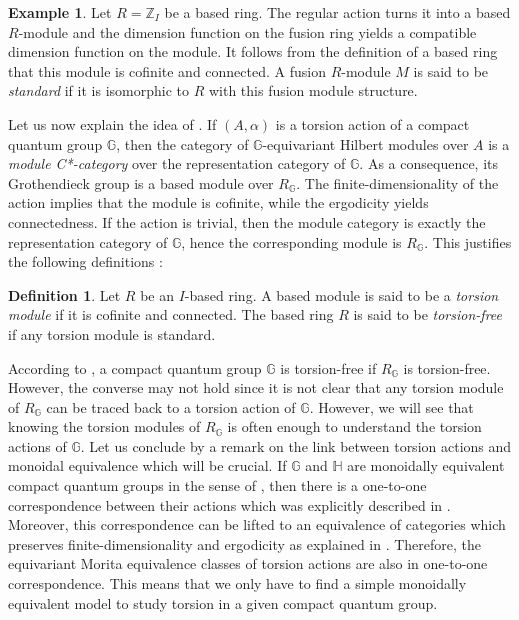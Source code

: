 \documentclass[a4paper, 11pt]{amsart}
\theoremstyle{plain}
\theoremstyle{definition}
\newtheorem{de}[thm]{Definition}
\newtheorem{ex}[thm]{Example}
\theoremstyle{remark}
\newcommand{\G}{\mathbb{G}}
\newcommand{\HH}{\mathbb{H}}
\newcommand{\Z}{\mathbb{Z}}
\begin{document}
\begin{ex}
Let $R = \Z_{I}$ be a based ring. The regular action turns it into a based $R$-module and the dimension function on the fusion ring yields a compatible dimension function on the module. It follows from the definition of a based ring that this module is cofinite and connected. A fusion $R$-module $M$ is said to be \emph{standard} if it is isomorphic to $R$ with this fusion module structure.
\end{ex}

Let us now explain the idea of \cite{arano2015torsion}. If $(A, \alpha)$ is a torsion action of a compact quantum group $\G$, then the category of $\G$-equivariant Hilbert modules over $A$ is a \emph{module C*-category} over the representation category of $\G$. As a consequence, its Grothendieck group is a based module over $R_{\G}$. The finite-dimensionality of the action implies that the module is cofinite, while the ergodicity yields connectedness. If the action is trivial, then the module category is exactly the representation category of $\G$, hence the corresponding module is $R_{\G}$. This justifies the following definitions :

\begin{de}
Let $R$ be an $I$-based ring. A based module is said to be a \emph{torsion module} if it is cofinite and connected. The based ring $R$ is said to be \emph{torsion-free} if any torsion module is standard.
\end{de}

According to \cite[Thm 2.8]{arano2015torsion}, a compact quantum group $\G$ is torsion-free if $R_{\G}$ is torsion-free. However, the converse may not hold since it is not clear that any torsion module of $R_{\G}$ can be traced back to a torsion action of $\G$. However, we will see that knowing the torsion modules of $R_{\G}$ is often enough to understand the torsion actions of $\G$. Let us conclude by a remark on the link between torsion actions and monoidal equivalence which will be crucial. If $\G$ and $\HH$ are monoidally equivalent compact quantum groups in the sense of \cite{bichon2006ergodic}, then there is a one-to-one correspondence between their actions which was explicitly described in \cite{de2010actions}. Moreover, this correspondence can be lifted to an equivalence of categories which preserves finite-dimensionality and ergodicity as explained in \cite[Sec 8]{voigt2011baum}. Therefore, the equivariant Morita equivalence classes of torsion actions are also in one-to-one correspondence. This means that we only have to find a simple monoidally equivalent model to study torsion in a given compact quantum group.
\end{document}
